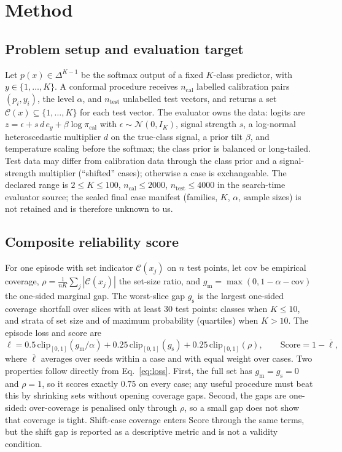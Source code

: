 \documentclass{article}
\newcommand{\score}{\mathrm{Score}}
\begin{document}
\section{Method}\label{sec:method}
\subsection{Problem setup and evaluation target}\label{sec:setup}
Let $p(x)\in\Delta^{K-1}$ be the softmax output of a fixed $K$-class predictor, with $y\in\{1,\dots,K\}$. A conformal procedure receives $n_{\mathrm{cal}}$ labelled calibration pairs $(p_i,y_i)$, the level $\alpha$, and $n_{\mathrm{test}}$ unlabelled test vectors, and returns a set $\mathcal C(x)\subseteq\{1,\dots,K\}$ for each test vector. The evaluator owns the data: logits are $z=\epsilon+s\,d\,e_y+\beta\log\pi_{\mathrm{cal}}$ with $\epsilon\sim\mathcal N(0,I_K)$, signal strength $s$, a log-normal heteroscedastic multiplier $d$ on the true-class signal, a prior tilt $\beta$, and temperature scaling before the softmax; the class prior is balanced or long-tailed. Test data may differ from calibration data through the class prior and a signal-strength multiplier (``shifted'' cases); otherwise a case is exchangeable. The declared range is $2\le K\le 100$, $n_{\mathrm{cal}}\le 2000$, $n_{\mathrm{test}}\le 4000$ in the search-time evaluator source; the sealed final case manifest (families, $K$, $\alpha$, sample sizes) is not retained and is therefore unknown to us.

\subsection{Composite reliability score}
For one episode with set indicator $\mathcal C(x_j)$ on $n$ test points, let $\mathrm{cov}$ be empirical coverage, $\rho=\frac1{nK}\sum_j|\mathcal C(x_j)|$ the set-size ratio, and $g_{\mathrm{m}}=\max(0,1-\alpha-\mathrm{cov})$ the one-sided marginal gap. The worst-slice gap $g_{\mathrm{s}}$ is the largest one-sided coverage shortfall over slices with at least 30 test points: classes when $K\le10$, and strata of set size and of maximum probability (quartiles) when $K>10$. The episode loss and score are
\begin{equation}
\ell=0.5\,\mathrm{clip}_{[0,1]}(g_{\mathrm m}/\alpha)+0.25\,\mathrm{clip}_{[0,1]}(g_{\mathrm s})+0.25\,\mathrm{clip}_{[0,1]}(\rho),\qquad \score=1-\overline{\ell},
\label{eq:loss}
\end{equation}
where $\overline\ell$ averages over seeds within a case and with equal weight over cases. Two properties follow directly from Eq.~\eqref{eq:loss}. First, the full set has $g_{\mathrm m}=g_{\mathrm s}=0$ and $\rho=1$, so it scores exactly $0.75$ on every case; any useful procedure must beat this by shrinking sets without opening coverage gaps. Second, the gaps are one-sided: over-coverage is penalised only through $\rho$, so a small gap does not show that coverage is tight. Shift-case coverage enters $\score$ through the same terms, but the shift gap is reported as a descriptive metric and is not a validity condition.
\end{document}

